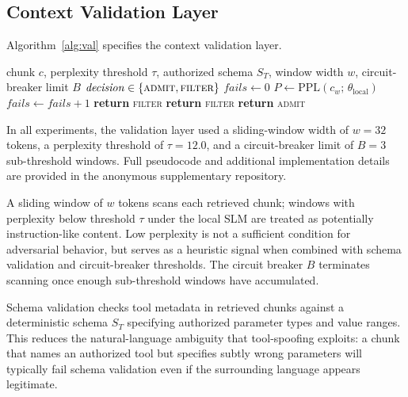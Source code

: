 \documentclass[sigconf]{acmart}
\begin{document}
\subsection{Context Validation Layer}
\label{sec:validation_arch}

Algorithm~\ref{alg:val} specifies the context validation layer.

\begin{algorithm}[t]
\caption{Context Validation}
\label{alg:val}
\begin{algorithmic}[1]
\REQUIRE chunk $c$, perplexity threshold $\tau$, authorized schema $S_T$,
  window width $w$, circuit-breaker limit $B$
\ENSURE $\mathit{decision}\in\{\textsc{admit},\textsc{filter}\}$
\STATE $\mathit{fails}\leftarrow 0$
  \STATE $P\leftarrow\mathrm{PPL}(c_w;\,\theta_{\mathrm{local}})$
    \STATE $\mathit{fails}\leftarrow\mathit{fails}+1$
      \STATE \textbf{return} \textsc{filter}
    \ENDIF
  \ENDIF
\ENDFOR
{}
    \STATE \textbf{return} \textsc{filter}
  \ENDIF
\ENDIF
\STATE \textbf{return} \textsc{admit}
\end{algorithmic}
\end{algorithm}

In all experiments, the validation layer used a sliding-window width of
$w = 32$ tokens, a perplexity threshold of $\tau = 12.0$, and a
circuit-breaker limit of $B = 3$ sub-threshold windows.
Full pseudocode and additional implementation details are provided in
the anonymous supplementary repository.

A sliding window of $w$ tokens scans each retrieved chunk; windows with
perplexity below threshold $\tau$ under the local SLM are treated as
potentially instruction-like content. Low perplexity is not a sufficient
condition for adversarial behavior, but serves as a heuristic signal when
combined with schema validation and circuit-breaker thresholds. The
circuit breaker $B$ terminates scanning once enough sub-threshold windows
have accumulated.

Schema validation checks tool metadata in retrieved chunks against a
deterministic schema $S_T$ specifying authorized parameter types and
value ranges. This reduces the natural-language ambiguity that
tool-spoofing exploits: a chunk that names an authorized tool but
specifies subtly wrong parameters will typically fail schema validation even if the surrounding language appears legitimate.
\end{document}
